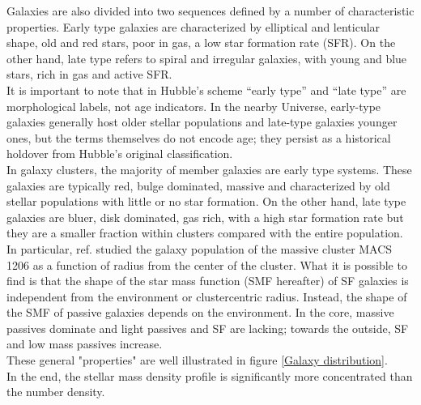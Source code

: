 Galaxies are also divided into two sequences defined by a number of characteristic properties. Early type galaxies are characterized by elliptical and lenticular shape, old and red stars, poor in gas, a low star formation rate (SFR). On the other hand, late type refers to spiral and irregular galaxies, with young and blue stars, rich in gas and active SFR.\\It is important to note that in Hubble’s scheme “early type” and “late type” are morphological labels, not age indicators. In the nearby Universe, early-type galaxies generally host older stellar populations and late-type galaxies younger ones, but the terms themselves do not encode age; they persist as a historical holdover from Hubble’s original classification.\\
In galaxy clusters, the majority of member galaxies are early type systems. These galaxies are typically red, bulge dominated, massive and characterized by old stellar populations with little or no star formation. On the other hand, late type galaxies are bluer, disk dominated, gas rich, with a high star formation rate but they are a smaller fraction within clusters compared with the entire population.
In particular, ref. \cite{Annunziatella_2014} studied the galaxy population of the massive cluster MACS 1206 as a function of radius from the center of the cluster. What it is possible to find is that the shape of the star mass function (SMF hereafter) of SF galaxies is independent from the environment or clustercentric radius. Instead, the shape of the SMF of passive galaxies depends on the environment. In the core, massive passives dominate and light passives and SF are lacking; towards the outside, SF and low mass passives increase.\\ These general "properties" are well illustrated in figure  \ref{Galaxy distribution}.\\ In the end, the stellar mass density profile is significantly more concentrated than the number density.\\

